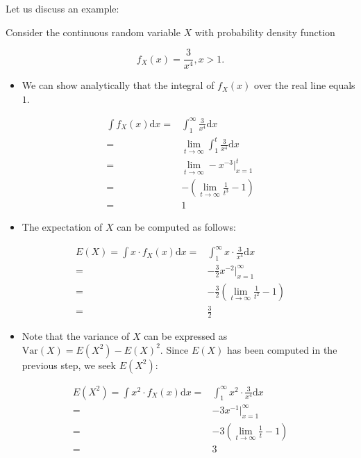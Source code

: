 \documentclass[]{book}
\providecommand{\tightlist}{%
  \setlength{\itemsep}{0pt}\setlength{\parskip}{0pt}}
\theoremstyle{definition}
\theoremstyle{definition}
\theoremstyle{definition}
\theoremstyle{remark}
\begin{document}
Let us discuss an example:

Consider the continuous random variable \(X\) with probability density
function

\[ f_X(x) = \frac{3}{x^4}, x>1. \]

\begin{itemize}
\tightlist
\item
  We can show analytically that the integral of \(f_X(x)\) over the real
  line equals \(1\).
\end{itemize}

\begin{align}
 \int f_X(x) \mathrm{d}x =&  \int_{1}^{\infty} \frac{3}{x^4} \mathrm{d}x \\
  =& \lim_{t \rightarrow \infty} \int_{1}^{t} \frac{3}{x^4} \mathrm{d}x \\
  =& \lim_{t \rightarrow \infty}  -x^{-3} \rvert_{x=1}^t \\
  =& -\left(\lim_{t \rightarrow \infty}\frac{1}{t^3} - 1\right) \\
  =& 1
\end{align}

\begin{itemize}
\tightlist
\item
  The expectation of \(X\) can be computed as follows:
\end{itemize}

\begin{align}
 E(X) = \int x \cdot f_X(x) \mathrm{d}x =&  \int_{1}^{\infty} x \cdot \frac{3}{x^4} \mathrm{d}x \\
  =& - \frac{3}{2} x^{-2} \rvert_{x=1}^{\infty} \\
  =& -\frac{3}{2} \left( \lim_{t \rightarrow \infty} \frac{1}{t^2} - 1 \right) \\
  =& \frac{3}{2}
\end{align}

\begin{itemize}
\tightlist
\item
  Note that the variance of \(X\) can be expressed as
  \(\text{Var}(X) = E(X^2) - E(X)^2\). Since \(E(X)\) has been computed
  in the previous step, we seek \(E(X^2)\):
\end{itemize}

\begin{align}
 E(X^2)= \int x^2 \cdot f_X(x) \mathrm{d}x =&  \int_{1}^{\infty} x^2 \cdot \frac{3}{x^4} \mathrm{d}x \\
  =& -3 x^{-1} \rvert_{x=1}^{\infty} \\
  =& -3 \left( \lim_{t \rightarrow \infty} \frac{1}{t} - 1 \right) \\
  =& 3
\end{align}
\end{document}
